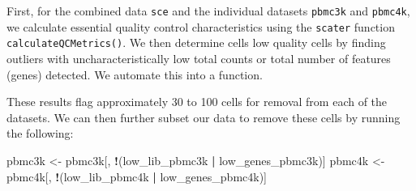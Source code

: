 \documentclass[]{book}
\newenvironment{Shaded}{\begin{snugshade}}{\end{snugshade}}
\newcommand{\CommentTok}[1]{\textcolor[rgb]{0.56,0.35,0.01}{\textit{#1}}}
\newcommand{\DataTypeTok}[1]{\textcolor[rgb]{0.13,0.29,0.53}{#1}}
\newcommand{\DecValTok}[1]{\textcolor[rgb]{0.00,0.00,0.81}{#1}}
\newcommand{\KeywordTok}[1]{\textcolor[rgb]{0.13,0.29,0.53}{\textbf{#1}}}
\newcommand{\NormalTok}[1]{#1}
\newcommand{\OperatorTok}[1]{\textcolor[rgb]{0.81,0.36,0.00}{\textbf{#1}}}
\newcommand{\StringTok}[1]{\textcolor[rgb]{0.31,0.60,0.02}{#1}}
\begin{document}
First, for the combined data \texttt{sce} and the individual datasets \texttt{pbmc3k} and \texttt{pbmc4k}, we calculate essential quality control characteristics using the \texttt{scater} function \texttt{calculateQCMetrics()}. We then determine cells low quality cells by finding outliers with uncharacteristically low total counts or total number of features (genes) detected. We automate this into a function.

\begin{Shaded}
\end{Shaded}

These results flag approximately 30 to 100 cells for removal from each of the datasets. We can then further subset our data to remove these cells by running the following:

\begin{Shaded}
\begin{Highlighting}[]
\NormalTok{pbmc3k <-}\StringTok{ }\NormalTok{pbmc3k[, }\OperatorTok{!}\NormalTok{(low_lib_pbmc3k }\OperatorTok{|}\StringTok{ }\NormalTok{low_genes_pbmc3k)]}
\NormalTok{pbmc4k <-}\StringTok{ }\NormalTok{pbmc4k[, }\OperatorTok{!}\NormalTok{(low_lib_pbmc4k }\OperatorTok{|}\StringTok{ }\NormalTok{low_genes_pbmc4k)]}
\end{Highlighting}
\end{Shaded}
\end{document}
